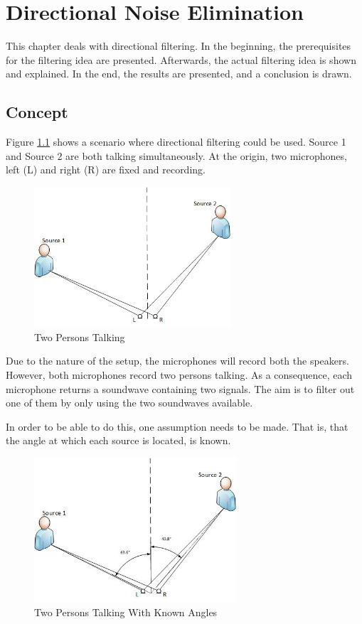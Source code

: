 \chapter{Directional Noise Elimination}\label{ch:directional}
This chapter deals with directional filtering. In the beginning, the prerequisites for 
the filtering idea are presented. Afterwards, the actual filtering idea is shown and explained.
In the end, the results are presented, and a conclusion is drawn.
\section{Concept}
Figure \ref{fig:2sources} shows a scenario where directional filtering could be used.
Source 1 and Source 2 are both talking simultaneously. At the origin, two microphones,
left (L) and right (R) are fixed and recording.

\begin{figure}[htp]
	\centering
	\includegraphics[width=0.65\textwidth]{Illustrations/2sources.jpg}
	\caption{Two Persons Talking}
	\label{fig:2sources}
\end{figure}

Due to the nature of the setup, the microphones will record  both the speakers.
However, both microphones record two persons talking. As a consequence, each microphone
returns a soundwave containing two signals. The aim is to filter out one of them
by only using the two soundwaves available.

In order to be able to do this, one assumption needs to be made. That is, that the 
angle at which each source is located, is known.

\begin{figure}[htp]
	\centering
	\includegraphics[width=0.67\textwidth]{Illustrations/2sourcesWangles.jpg}
	\caption{Two Persons Talking With Known Angles}
	\label{fig:2sourcesWangles}
\end{figure}

